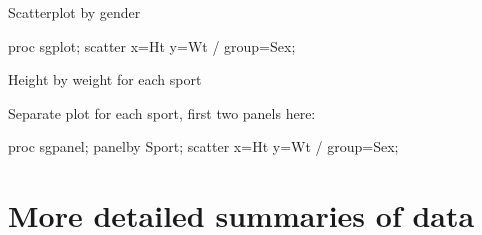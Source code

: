 \documentclass[unknownkeysallowed]{beamer}\usepackage[]{graphicx}\usepackage[]{color}
\begin{document}
\begin{frame}[fragile]{Scatterplot by gender}
  
  \begin{Sascode}[store=gk]
proc sgplot;
  scatter x=Ht y=Wt / group=Sex;
  \end{Sascode}
  
  
\end{frame}

\begin{frame}[fragile]{Height by weight for each sport}
  
  Separate plot for each sport, first two panels here:
  
  \begin{Sascode}[store=gl]
proc sgpanel;
  panelby Sport;
  scatter x=Ht y=Wt / group=Sex;
  \end{Sascode}
  
  
  
\end{frame}





\section{More detailed summaries of data}

\frame{\sectionpage}
\end{document}
